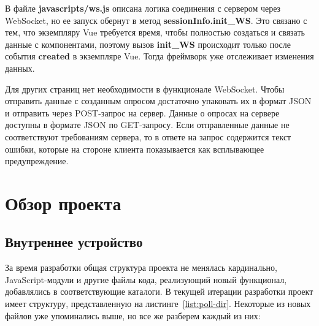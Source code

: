 В файле \textbf{javascripts/ws.js} описана логика соединения с сервером через WebSocket, но ее запуск обернут в метод  
\textbf{sessionInfo.init\_WS}. Это связано с тем, что экземпляру Vue требуется время, чтобы полностью создаться и связать данные с компонентами, поэтому вызов \textbf{init\_WS} происходит только после события \textbf{created} в экземпляре Vue. Тогда фреймворк уже отслеживает изменения данных.
 
Для других страниц нет необходимости в функционале WebSocket. Чтобы отправить данные с созданным опросом достаточно упаковать их в формат JSON и отправить через POST-запрос на сервер. Данные о опросах на сервере доступны в формате JSON по GET-запросу. Если  отправленные данные не соответствуют требованиям сервера, то в ответе на запрос содержится текст ошибки, которые на стороне клиента показывается как всплывающее предупреждение.        

\section{Обзор проекта}
\subsection{Внутреннее устройство}
За время разработки общая структура проекта не менялась кардинально, JavaScript-модули и другие файлы кода, реализующий новый функционал, добавлялись в соответствующие каталоги. В текущей итерации разработки проект имеет структуру, представленную на листинге~\ref{list:poll-dir}. Некоторые из новых файлов уже упоминались выше, но все же разберем каждый из них:

